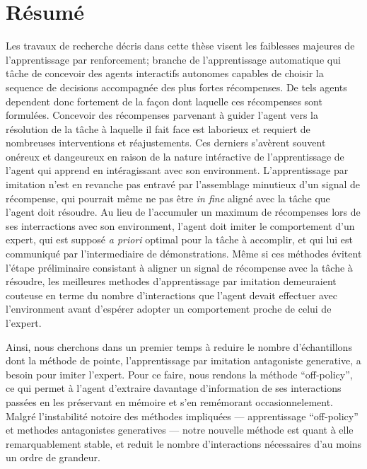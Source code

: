 

\thispagestyle{empty}
\chapter*{Résumé}

Les travaux de recherche décris dans cette thèse visent les faiblesses majeures
de l'apprentissage par renforcement; branche de l'apprentissage automatique
qui tâche de concevoir des agents interactifs autonomes capables de choisir la
sequence de decisions accompagnée des plus fortes récompenses.
De tels agents dependent donc fortement de la façon dont laquelle ces récompenses sont formulées.
Concevoir des récompenses parvenant à guider l'agent vers la résolution de la tâche à laquelle
il fait face est laborieux et requiert de nombreuses interventions et réajustements.
Ces derniers s'avèrent souvent onéreux et dangeureux en raison de la nature intéractive de
l'apprentissage de l'agent qui apprend en intéragissant avec son environment.
L'apprentissage par imitation n'est en revanche pas entravé par l'assemblage minutieux
d'un signal de récompense, qui pourrait même ne pas être \textit{in fine} aligné avec la
tâche que l'agent doit résoudre.
Au lieu de l'accumuler un maximum de récompenses lors de ses interractions avec son
environment, l'agent doit imiter le comportement d'un expert,
qui est supposé \textit{a priori} optimal pour la tâche à accomplir, et
qui lui est communiqué par l'intermediaire de démonstrations.
Même si ces méthodes évitent l'étape préliminaire consistant à aligner un signal
de récompense avec la tâche à résoudre, les meilleures methodes d'apprentissage
par imitation demeuraient couteuse en terme du nombre d'interactions que l'agent
devait effectuer avec l'environment avant d'espérer adopter un comportement proche
de celui de l'expert.

Ainsi, nous cherchons dans un premier temps
à reduire le nombre d'échantillons dont la méthode de pointe,
l'apprentissage par imitation antagoniste generative,
a besoin pour imiter l'expert.
Pour ce faire, nous rendons la méthode ``off-policy'',
ce qui permet à l'agent d'extraire davantage d'information de ses interactions passées
en les préservant en mémoire et s'en remémorant occasionnelement.
Malgré l'instabilité notoire des méthodes impliquées
--- apprentissage ``off-policy'' et methodes antagonistes generatives ---
notre nouvelle méthode est quant à elle remarquablement stable,
et reduit le nombre d'interactions nécessaires d'au moins un ordre de grandeur.

